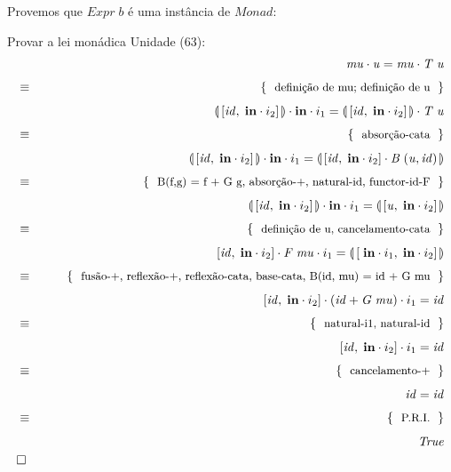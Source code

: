 \documentclass[11pt, a4paper, fleqn]{article}
\newcommand{\Conid}[1]{\mathit{#1}}
\newcommand{\Varid}[1]{\mathit{#1}}
\begin{document}
Provemos que \ensuremath{\Conid{Expr}\;\Varid{b}} é uma instância de \ensuremath{\Conid{Monad}}:

Provar a lei monádica Unidade (63):
\begin{eqnarray*}
\start
\ensuremath{\Varid{mu}\comp \Varid{u}\mathrel{=}\Varid{mu}\comp \Conid{T}\;\Varid{u}}
\just\equiv{ definição de mu; definição de u }
\ensuremath{\llparenthesis\, \alt{\Varid{id}}{\;\mathbf{in}\comp i_2}\,\rrparenthesis\comp \mathbf{in}\comp i_1\mathrel{=}\llparenthesis\, \alt{\Varid{id}}{\;\mathbf{in}\comp i_2}\,\rrparenthesis\comp \Conid{T}\;\Varid{u}}
\just\equiv{ absorção-cata }
\ensuremath{\llparenthesis\, \alt{\Varid{id}}{\;\mathbf{in}\comp i_2}\,\rrparenthesis\comp \mathbf{in}\comp i_1\mathrel{=}\llparenthesis\, \alt{\Varid{id}}{\;\mathbf{in}\comp i_2}\comp \Conid{B}\;(\Varid{u},\Varid{id})\,\rrparenthesis}
\just\equiv{ B(f,g) = f + G g, absorção-+, natural-id, functor-id-F }
\ensuremath{\llparenthesis\, \alt{\Varid{id}}{\;\mathbf{in}\comp i_2}\,\rrparenthesis\comp \mathbf{in}\comp i_1\mathrel{=}\llparenthesis\, \alt{\Varid{u}}{\;\mathbf{in}\comp i_2}\,\rrparenthesis}
\just\equiv{ definição de u, cancelamento-cata }
\ensuremath{\alt{\Varid{id}}{\;\mathbf{in}\comp i_2}\comp \Conid{F}\;\Varid{mu}\comp i_1\mathrel{=}\llparenthesis\, \alt{\;\mathbf{in}\comp i_1}{\;\mathbf{in}\comp i_2}\,\rrparenthesis}
\just\equiv{ fusão-+, reflexão-+, reflexão-cata, base-cata, B(id, mu) = id + G mu }
\ensuremath{\alt{\Varid{id}}{\;\mathbf{in}\comp i_2}\comp (\Varid{id}\mathbin{+}\Conid{G}\;\Varid{mu})\comp i_1\mathrel{=}\Varid{id}}
\just\equiv{ natural-i1, natural-id }
\ensuremath{\alt{\Varid{id}}{\;\mathbf{in}\comp i_2}\comp i_1\mathrel{=}\Varid{id}}
\just\equiv{ cancelamento-+ }
\ensuremath{\Varid{id}\mathrel{=}\Varid{id}}
\just\equiv{ P.R.I. }
\ensuremath{\Conid{True}}
\qed
\end{eqnarray*}
\end{document}
